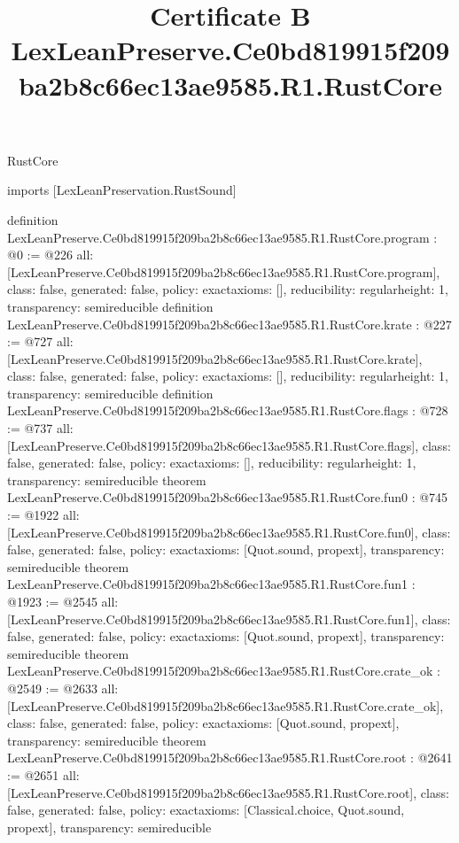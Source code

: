 \begin{lexlean}{RustCore}
\title{Certificate B LexLeanPreserve.Ce0bd819915f209ba2b8c66ec13ae9585.R1.RustCore}
\begin{coremodule}
imports [LexLeanPreservation.RustSound]

definition LexLeanPreserve.Ce0bd819915f209ba2b8c66ec13ae9585.R1.RustCore.program : @0 := @226 {
  all: [LexLeanPreserve.Ce0bd819915f209ba2b8c66ec13ae9585.R1.RustCore.program],
  class: false,
  generated: false,
  policy: exact{axioms: []},
  reducibility: regular{height: 1},
  transparency: semireducible
}
definition LexLeanPreserve.Ce0bd819915f209ba2b8c66ec13ae9585.R1.RustCore.krate : @227 := @727 {
  all: [LexLeanPreserve.Ce0bd819915f209ba2b8c66ec13ae9585.R1.RustCore.krate],
  class: false,
  generated: false,
  policy: exact{axioms: []},
  reducibility: regular{height: 1},
  transparency: semireducible
}
definition LexLeanPreserve.Ce0bd819915f209ba2b8c66ec13ae9585.R1.RustCore.flags : @728 := @737 {
  all: [LexLeanPreserve.Ce0bd819915f209ba2b8c66ec13ae9585.R1.RustCore.flags],
  class: false,
  generated: false,
  policy: exact{axioms: []},
  reducibility: regular{height: 1},
  transparency: semireducible
}
theorem LexLeanPreserve.Ce0bd819915f209ba2b8c66ec13ae9585.R1.RustCore.fun0 : @745 := @1922 {
  all: [LexLeanPreserve.Ce0bd819915f209ba2b8c66ec13ae9585.R1.RustCore.fun0],
  class: false,
  generated: false,
  policy: exact{axioms: [Quot.sound, propext]},
  transparency: semireducible
}
theorem LexLeanPreserve.Ce0bd819915f209ba2b8c66ec13ae9585.R1.RustCore.fun1 : @1923 := @2545 {
  all: [LexLeanPreserve.Ce0bd819915f209ba2b8c66ec13ae9585.R1.RustCore.fun1],
  class: false,
  generated: false,
  policy: exact{axioms: [Quot.sound, propext]},
  transparency: semireducible
}
theorem LexLeanPreserve.Ce0bd819915f209ba2b8c66ec13ae9585.R1.RustCore.crate_ok : @2549 := @2633 {
  all: [LexLeanPreserve.Ce0bd819915f209ba2b8c66ec13ae9585.R1.RustCore.crate_ok],
  class: false,
  generated: false,
  policy: exact{axioms: [Quot.sound, propext]},
  transparency: semireducible
}
theorem LexLeanPreserve.Ce0bd819915f209ba2b8c66ec13ae9585.R1.RustCore.root : @2641 := @2651 {
  all: [LexLeanPreserve.Ce0bd819915f209ba2b8c66ec13ae9585.R1.RustCore.root],
  class: false,
  generated: false,
  policy: exact{axioms: [Classical.choice, Quot.sound, propext]},
  transparency: semireducible
}


\end{coremodule}
\end{lexlean}
